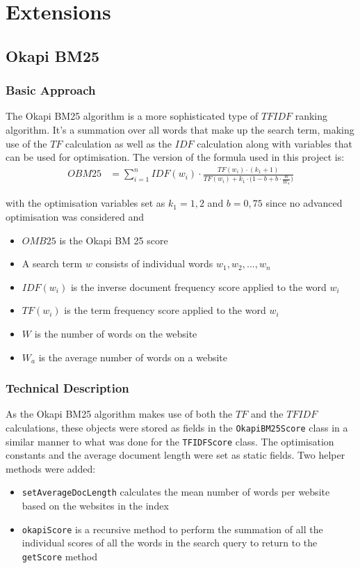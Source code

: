 \chapter{Extensions}

\section{Okapi BM25}

\subsection{Basic Approach}
The Okapi BM25 algorithm is a more sophisticated type of $TFIDF$ ranking algorithm.
It's a summation over all words that make up the search term, making use of the $TF$ calculation as well as the $IDF$ calculation along with variables that can be used for optimisation. \citep{robertson2009probabilistic}
The version of the formula used in this project is:
\begin{align}
    OBM25 &= \sum_{i=1}^n IDF(w_i) \cdot \frac{TF(w_i)\cdot (k_1 + 1)}{TF(w_i) + k_1\cdot \big( 1 - b + b\cdot \frac{W}{W_a} \big)}
    \label{eq:OBM25}
\end{align}

with the optimisation variables set as $k_1 = 1,2$ and $b = 0,75$ since no advanced optimisation was considered and

\begin{itemize}
    \item $OMB25$ is the Okapi BM 25 score
    \item A search term $w$ consists of individual words $w_1, w_2, ..., w_n$
    \item $IDF(w_i)$ is the inverse document frequency score applied to the word $w_i$
    \item $TF(w_i)$ is the term frequency score applied to the word $w_i$
    \item $W$ is the number of words on the website
    \item $W_a$ is the average number of words on a website
\end{itemize}

\subsection{Technical Description}
As the Okapi BM25 algorithm makes use of both the $TF$ and the $TFIDF$ calculations, these objects were stored as fields in the {\tt OkapiBM25Score} class in a similar manner to what was done for the {\tt TFIDFScore} class. The optimisation constants and the average document length were set as static fields. Two helper methods were added:
\begin{itemize}
    \item {\tt setAverageDocLength} calculates the mean number of words per website based on the websites in the index
    \item {\tt okapiScore} is a recursive method to perform the summation of all the individual scores of all the words in the search query to return to the {\tt getScore} method
\end{itemize}


